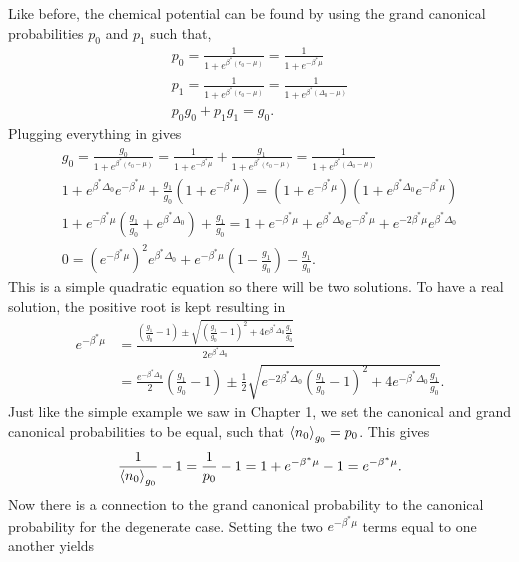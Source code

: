 Like before, the chemical potential can be found by using the grand canonical probabilities $p_0$ and $p_1$ such that,
\begin{gather}
    p_0=\frac{1}{1+e^{\beta^*(\epsilon_0-\mu)}}=\frac{1}{1+e^{-\beta^* \mu}} \label{grcn}\\
    p_1=\frac{1}{1+e^{\beta^*(\epsilon_0-\mu)}}=\frac{1}{1+e^{\beta^*(\Delta_0-\mu)}}\\
    p_0g_0+p_1g_1=g_0.
\end{gather}
Plugging everything in gives
\begin{gather}
    g_0=\frac{g_0}{1+e^{\beta^*(\epsilon_0-\mu)}}=\frac{1}{1+e^{-\beta^*\mu}}+\frac{g_1}{1+e^{\beta^*(\epsilon_0-\mu)}}=\frac{1}{1+e^{\beta^*(\Delta_0-\mu)}}\nonumber\\
    1+e^{\beta^*\Delta_0} e^{-\beta^*\mu}+\frac{g_1}{g_0}(1+e^{-\beta^*\mu})=(1+e^{-\beta^*\mu})(1+e^{\beta^*\Delta_0} e^{-\beta^* \mu})\nonumber\\
    1+e^{-\beta^*\mu}(\frac{g_1}{g_0}+e^{\beta^*\Delta_0})+\frac{g_1}{g_0}=1+e^{-\beta^*\mu}+e^{\beta^*\Delta_0}e^{-\beta^*\mu}+e^{-2\beta^*\mu}e^{\beta^*\Delta_0}\nonumber\\
    0=(e^{-\beta^*\mu})^2 e^{\beta^*\Delta_0} +e ^{-\beta^*\mu}(1-\frac{g_1}{g_0})-\frac{g_1}{g_0}.
\end{gather}
This is a simple quadratic equation so there will be two solutions. To have a real solution, the positive root is kept resulting in
\begin{align}
    e^{-\beta^*\mu}&=\frac{(\frac{g_1}{g_0}-1)\pm\sqrt{(\frac{g_1}{g_0}-1)^2+4e^{\beta^*\Delta_0}\frac{g_1}{g_0}}}{2e^{\beta^*\Delta_0}}\nonumber\\
    &=\frac{e^{-\beta^*\Delta_0}}{2}(\frac{g_1}{g_0}-1)\pm \frac{1}{2}\sqrt{e^{-2\beta^*\Delta_0} (\frac{g_1}{g_0}-1)^2+ 4e^{-\beta^*\Delta_0}\frac{g_1}{g_0}}.
\end{align}
Just like the simple example we saw in Chapter 1, we set the canonical and grand canonical probabilities to be equal, such that $\left<{n_0}\right>_{g_0}=p_0$. This gives 
\begin{align}
    \frac{1}{\left<{n_0}\right>_{g_0}}-1=\frac{1}{p_0}-1=1+e^{-\beta^*\mu}-1=e^{-\beta^*\mu} .
\end{align}
Now there is a connection to the grand canonical probability to the canonical probability for the degenerate case. Setting the two $e^{-\beta^*\mu}$ terms equal to one another yields
